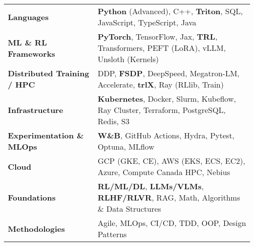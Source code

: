 \begin{tabularx}{\textwidth}{@{} >{\bfseries}l L @{}}
Languages &
  \textbf{Python} (Advanced), C++, \textbf{Triton}, SQL, JavaScript, TypeScript, Java \\[2pt]
ML \& RL Frameworks &
  \textbf{PyTorch}, TensorFlow, Jax, \textbf{TRL}, Transformers, PEFT (LoRA), vLLM, Unsloth (Kernels) \\
Distributed Training / HPC &
  DDP, \textbf{FSDP}, DeepSpeed, Megatron-LM, Accelerate, \textbf{trlX}, Ray (RLlib, Train) \\[2pt]
Infrastructure &
  \textbf{Kubernetes}, Docker, Slurm, Kubeflow, Ray Cluster, Terraform, PostgreSQL, Redis, S3 \\[2pt]
Experimentation \& MLOps &
  \textbf{W\&B}, GitHub Actions, Hydra, Pytest, Optuna, MLflow \\[2pt]
Cloud &
  GCP (GKE, CE), AWS (EKS, ECS, EC2), Azure, Compute Canada HPC, Nebius \\[2pt]
Foundations &
     \textbf{RL/ML/DL}, \textbf{LLMs/VLMs}, \textbf{RLHF/RLVR}, RAG, Math, Algorithms \& Data Structures \\
Methodologies &
  Agile, MLOps, CI/CD, TDD, OOP, Design Patterns \\[2pt]
\end{tabularx}






